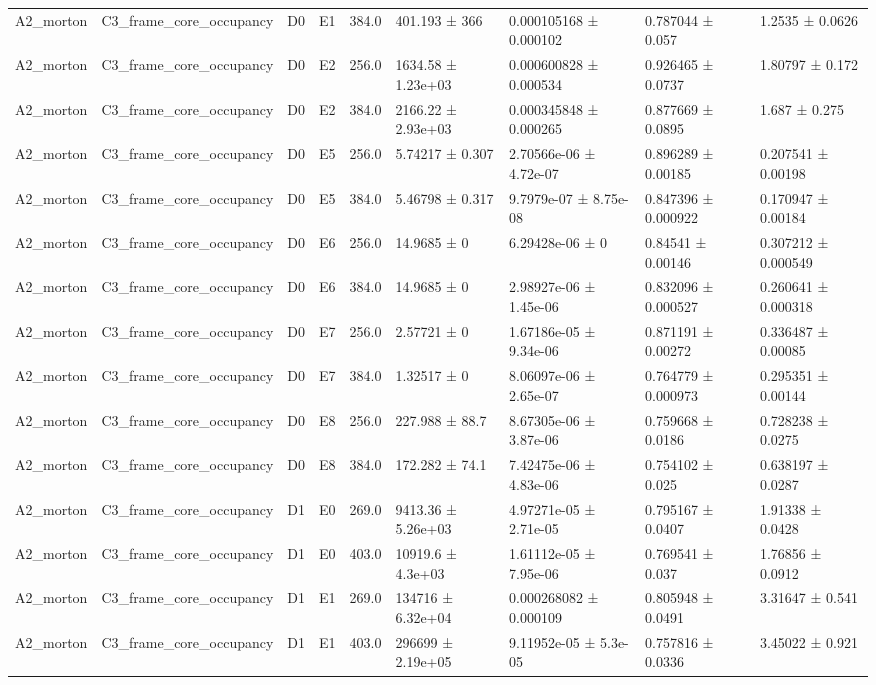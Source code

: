 \begin{table}
\begin{tabular}{lllllllll}
A2\_morton & C3\_frame\_core\_occupancy & D0 & E1 & 384.0 & 401.193 ± 366 & 0.000105168 ± 0.000102 & 0.787044 ± 0.057 & 1.2535 ± 0.0626 \\
A2\_morton & C3\_frame\_core\_occupancy & D0 & E2 & 256.0 & 1634.58 ± 1.23e+03 & 0.000600828 ± 0.000534 & 0.926465 ± 0.0737 & 1.80797 ± 0.172 \\
A2\_morton & C3\_frame\_core\_occupancy & D0 & E2 & 384.0 & 2166.22 ± 2.93e+03 & 0.000345848 ± 0.000265 & 0.877669 ± 0.0895 & 1.687 ± 0.275 \\
A2\_morton & C3\_frame\_core\_occupancy & D0 & E5 & 256.0 & 5.74217 ± 0.307 & 2.70566e-06 ± 4.72e-07 & 0.896289 ± 0.00185 & 0.207541 ± 0.00198 \\
A2\_morton & C3\_frame\_core\_occupancy & D0 & E5 & 384.0 & 5.46798 ± 0.317 & 9.7979e-07 ± 8.75e-08 & 0.847396 ± 0.000922 & 0.170947 ± 0.00184 \\
A2\_morton & C3\_frame\_core\_occupancy & D0 & E6 & 256.0 & 14.9685 ± 0 & 6.29428e-06 ± 0 & 0.84541 ± 0.00146 & 0.307212 ± 0.000549 \\
A2\_morton & C3\_frame\_core\_occupancy & D0 & E6 & 384.0 & 14.9685 ± 0 & 2.98927e-06 ± 1.45e-06 & 0.832096 ± 0.000527 & 0.260641 ± 0.000318 \\
A2\_morton & C3\_frame\_core\_occupancy & D0 & E7 & 256.0 & 2.57721 ± 0 & 1.67186e-05 ± 9.34e-06 & 0.871191 ± 0.00272 & 0.336487 ± 0.00085 \\
A2\_morton & C3\_frame\_core\_occupancy & D0 & E7 & 384.0 & 1.32517 ± 0 & 8.06097e-06 ± 2.65e-07 & 0.764779 ± 0.000973 & 0.295351 ± 0.00144 \\
A2\_morton & C3\_frame\_core\_occupancy & D0 & E8 & 256.0 & 227.988 ± 88.7 & 8.67305e-06 ± 3.87e-06 & 0.759668 ± 0.0186 & 0.728238 ± 0.0275 \\
A2\_morton & C3\_frame\_core\_occupancy & D0 & E8 & 384.0 & 172.282 ± 74.1 & 7.42475e-06 ± 4.83e-06 & 0.754102 ± 0.025 & 0.638197 ± 0.0287 \\
A2\_morton & C3\_frame\_core\_occupancy & D1 & E0 & 269.0 & 9413.36 ± 5.26e+03 & 4.97271e-05 ± 2.71e-05 & 0.795167 ± 0.0407 & 1.91338 ± 0.0428 \\
A2\_morton & C3\_frame\_core\_occupancy & D1 & E0 & 403.0 & 10919.6 ± 4.3e+03 & 1.61112e-05 ± 7.95e-06 & 0.769541 ± 0.037 & 1.76856 ± 0.0912 \\
A2\_morton & C3\_frame\_core\_occupancy & D1 & E1 & 269.0 & 134716 ± 6.32e+04 & 0.000268082 ± 0.000109 & 0.805948 ± 0.0491 & 3.31647 ± 0.541 \\
A2\_morton & C3\_frame\_core\_occupancy & D1 & E1 & 403.0 & 296699 ± 2.19e+05 & 9.11952e-05 ± 5.3e-05 & 0.757816 ± 0.0336 & 3.45022 ± 0.921 \\

\end{tabular}
\end{table}
